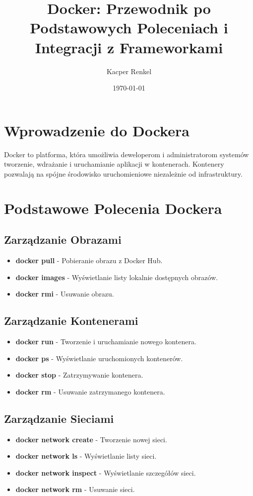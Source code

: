 \documentclass[a4paper,12pt]{article}
\title{Docker: Przewodnik po Podstawowych Poleceniach i Integracji z Frameworkami}
\author{Kacper Renkel}
\date{\today}
\begin{document}
\maketitle
\tableofcontents

\newpage

\section{Wprowadzenie do Dockera}
Docker to platforma, która umożliwia deweloperom i administratorom systemów tworzenie, wdrażanie i uruchamianie aplikacji w kontenerach. Kontenery pozwalają na spójne środowisko uruchomieniowe niezależnie od infrastruktury.

\section{Podstawowe Polecenia Dockera}

\subsection{Zarządzanie Obrazami}
\begin{itemize}
    \item \textbf{docker pull} - Pobieranie obrazu z Docker Hub.
    \item \textbf{docker images} - Wyświetlanie listy lokalnie dostępnych obrazów.
    \item \textbf{docker rmi} - Usuwanie obrazu.
\end{itemize}

\subsection{Zarządzanie Kontenerami}
\begin{itemize}
    \item \textbf{docker run} - Tworzenie i uruchamianie nowego kontenera.
    \item \textbf{docker ps} - Wyświetlanie uruchomionych kontenerów.
    \item \textbf{docker stop} - Zatrzymywanie kontenera.
    \item \textbf{docker rm} - Usuwanie zatrzymanego kontenera.
\end{itemize}

\subsection{Zarządzanie Sieciami}
\begin{itemize}
    \item \textbf{docker network create} - Tworzenie nowej sieci.
    \item \textbf{docker network ls} - Wyświetlanie listy sieci.
    \item \textbf{docker network inspect} - Wyświetlanie szczegółów sieci.
    \item \textbf{docker network rm} - Usuwanie sieci.
\end{itemize}
\end{document}

